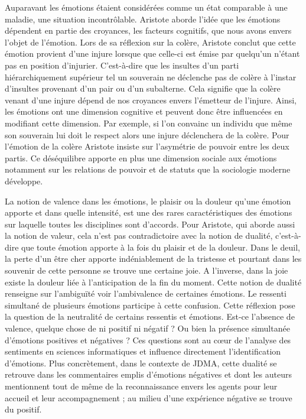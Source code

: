 \documentclass[a4paper,12pt]{report}
\begin{document}
Auparavant les émotions étaient considérées comme un état comparable à une maladie, une situation incontrôlable. Aristote aborde l'idée que les émotions dépendent en partie des croyances, les facteurs cognitifs, que nous avons envers l'objet de l'émotion. Lors de sa réflexion sur la colère, Aristote conclut que cette émotion provient d'une injure lorsque que celle-ci est émise par quelqu'un n'étant pas en position d'injurier. C'est-à-dire que les insultes d'un parti hiérarchiquement supérieur tel un souverain ne déclenche pas de colère à l'instar d'insultes provenant d'un pair ou d'un subalterne. Cela signifie que la colère venant d'une injure dépend de nos croyances envers l'émetteur de l'injure. Ainsi, les émotions ont une dimension cognitive et peuvent donc être influencées en modifiant cette dimension. Par exemple, si l'on convainc un individu que même son souverain lui doit le respect alors une injure déclenchera de la colère. Pour l'émotion de la colère Aristote insiste sur l'asymétrie de pouvoir entre les deux partis. Ce déséquilibre apporte en plus une dimension sociale aux émotions notamment sur les relations de pouvoir et de statuts que la sociologie moderne développe. \par 

La notion de valence dans les émotions, le plaisir ou la douleur qu'une émotion apporte et dans quelle intensité, est une des rares caractéristiques des émotions sur laquelle toutes les disciplines sont d'accords. Pour Aristote, qui aborde aussi la notion de valeur, cela n'est pas contradictoire avec la notion de dualité, c'est-à-dire que toute émotion apporte à la fois du plaisir et de la douleur. Dans le deuil, la perte d'un être cher apporte indéniablement de la tristesse et pourtant dans les souvenir de cette personne se trouve une certaine joie. A l'inverse, dans la joie existe la douleur liée à l'anticipation de la fin du moment. Cette notion de dualité renseigne sur l'ambiguïté voir l'ambivalence de certaines émotions. Le ressenti simultané de plusieurs émotions participe à cette confusion. Cette réflexion pose la question de la neutralité de certains ressentis et émotions. Est-ce l'absence de valence, quelque chose de ni positif ni négatif ? Ou bien la présence simultanée d'émotions positives et négatives ? Ces questions sont au cœur de l'analyse des sentiments en sciences informatiques et influence directement l'identification d'émotions. Plus concrètement, dans le contexte de JDMA, cette dualité se retrouve dans les commentaires emplis d'émotions négatives et dont les auteurs mentionnent tout de même de la reconnaissance envers les agents pour leur accueil et leur accompagnement ; au milieu d'une expérience négative se trouve du positif. \par 
\end{document}
